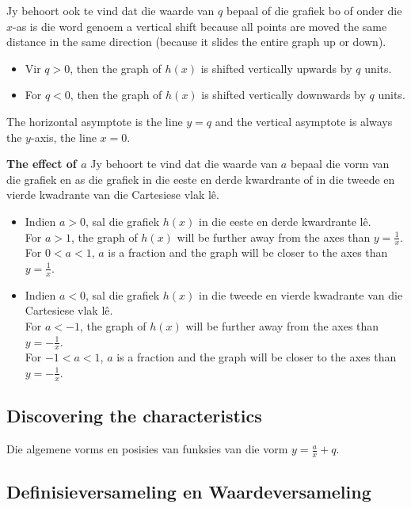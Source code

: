 Jy behoort ook te vind dat die waarde van $q$ bepaal of die grafiek bo of onder die $x$-as is die word genoem a vertical shift because all points are moved the same distance in the same direction (because it slides the entire graph up or down). 
\begin{itemize}
\item Vir $q>0$, then the graph of $h(x)$ is shifted vertically upwards by $q$ units. 
\item For $q<0$, then the graph of $h(x)$ is shifted vertically downwards by $q$ units.
\end{itemize}
The horizontal asymptote is the line $y=q$ and the vertical asymptote is always the $y$-axis, the line $x=0$.\par
\vspace{8pt}
\textbf{The effect of $a$}\newline
Jy behoort te vind dat die waarde van $a$ bepaal die vorm van die grafiek  en as die grafiek in die eeste en derde kwardrante of in die tweede
en vierde kwadrante van die Cartesiese vlak lê. 
\begin{itemize}
 \item Indien $a>0$, sal die grafiek $h(x)$ in die eeste en derde kwardrante lê. \\
For $a>1$, the graph of $h(x)$ will be further away from the axes than $y=\frac{1}{x}$.
\\For $0<a<1$, $a$ is a fraction and the graph will be closer to the axes than $y=\frac{1}{x}$. 
\item Indien $a<0$, sal die grafiek $h(x)$ in die tweede
en vierde kwadrante van die Cartesiese vlak lê.\\
For $a<-1$, the graph of $h(x)$ will be further away from the axes than $y=-\frac{1}{x}$.
\\For $-1<a<1$, $a$ is a fraction and the graph will be closer to the axes than $y=-\frac{1}{x}$. 
\end{itemize}



\subsection*{Discovering the characteristics}  
Die algemene vorms en posisies van funksies van die vorm $y=\frac{a}{x}+q$.

\subsection*{Definisieversameling en Waardeversameling}

